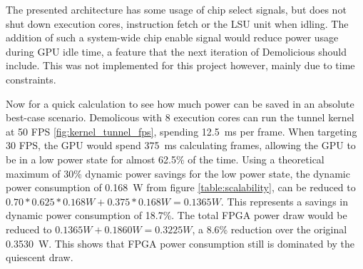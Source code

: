 \documentclass[../main/report.tex]{subfiles}
\begin{document}
The presented architecture has some usage of chip select signals, but does not shut down execution cores, instruction fetch or the LSU unit when idling.
The addition of such a system-wide chip enable signal would reduce power usage during GPU idle time, a feature that the next iteration of Demolicious should include.
This was not implemented for this project however, mainly due to time constraints.

Now for a quick calculation to see how much power can be saved in an absolute best-case scenario.
Demolicous with 8 execution cores can run the tunnel kernel at 50 FPS \ref{fig:kernel_tunnel_fps}, spending \SI{12.5}{ms} per frame.
When targeting 30 FPS, the GPU would spend \SI{375}{ms} calculating frames, allowing the GPU to be in a low power state for almost 62.5\% of the time.
Using a theoretical maximum of 30\% dynamic power savings for the low power state, the dynamic power consumption of \SI{0.168}{W} from figure \ref{table:scalability}, can be reduced to $ 0.70 * 0.625 * 0.168 W + 0.375 * 0.168 W = 0.1365 W$.
This represents a savings in dynamic power consumption of 18.7\%.
The total FPGA power draw would be reduced to $ 0.1365 W + 0.1860 W = 0.3225 W$, a 8.6\% reduction over the original \SI{0.3530}{W}.
This shows that FPGA power consumption still is dominated by the quiescent draw.
\end{document}
